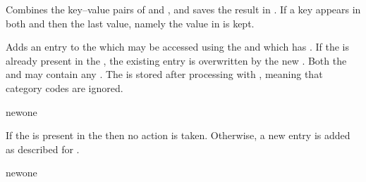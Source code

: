 \documentclass[oneside]{book}
\begin{document}
\begin{function}{\propConcat}
\begin{syntax}
   
\end{syntax}
Combines the key--value pairs of  and
, and saves the result in .  If a
key appears in both  and  then the
last value, namely the value in  is kept.
\begin{codehigh}
\propSetFromKeyval {}
\propSetFromKeyval {}
\propConcat \lTmpaProp \lTmpbProp \lTmpcProp
\propVarLog \lTmpaProp
\end{codehigh}
\end{function}

\begin{function}{\propPut}
\begin{syntax}
   
\end{syntax}
Adds an entry to the  which may be accessed
using the  and which has . If the 
is already present in the , the existing entry
is overwritten by the new . Both the  and
 may contain any . The  is
stored after processing with , meaning that category
codes are ignored.
\begin{codehigh}
\propSetFromKeyval {}
\propPut {} {newone}
\propVarLog \lTmpaProp
\end{codehigh}
\end{function}

\begin{function}{\propPutIfNew}
\begin{syntax}
   
\end{syntax}
If the  is present in the  then no
action is taken. Otherwise, a new entry is added as described for
.
\begin{codehigh}
\propSetFromKeyval {}
\propPutIfNew {} {newone}
\propVarLog \lTmpaProp
\end{codehigh}
\end{function}
\end{document}
